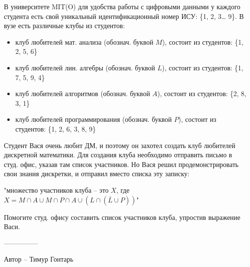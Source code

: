 \question
В университете MIT(O) для удобства работы с цифровыми данными у каждого студента есть свой уникальный идентификационный номер ИСУ: \{1, 2, 3… 9\}. В вузе есть различные клубы из студентов:
\begin{itemize}
    \item клуб любителей мат. анализа (обознач. буквой $M$), состоит из студентов: \{1, 2, 5, 6\}
    \item клуб любителей лин. алгебры (обознач. буквой $L$), состоит из студентов: \{1, 7, 5, 9, 4\}
    \item клуб любителей алгоритмов (обознач. буквой $A$), состоит из студентов: \{2, 8, 3, 1\}
    \item клуб любителей программирования (обознач. буквой $P$), состоит из студентов: \{1, 2, 6, 3, 8, 9\}
\end{itemize}
Студент Вася очень любит ДМ, и поэтому он захотел создать клуб любителей дискретной математики. Для создания клуба необходимо отправить письмо в студ. офис, указав там список участников. Но Вася решил продемонстрировать свои знания дискретки, и отправил вместо списка эту записку:
\begin{center}
"множество участников клуба -- это $X$, где $X=M \cap A \cup M \cap P \cap A \cup (L \cap (\overline{L} \cup P))$"
\end{center}

Помогите студ. офису составить список участников клуба, упростив выражение Васи.

---------------

Автор -- Тимур Гонтарь